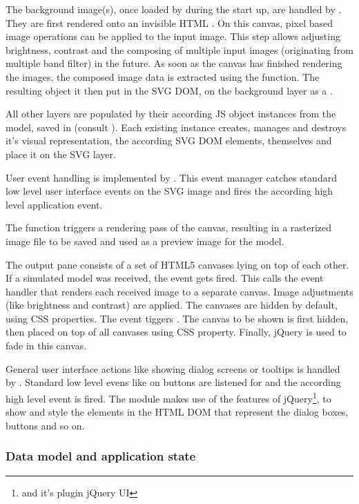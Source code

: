 The background image(s), once loaded by  during the start up, are handled by .
They are first rendered onto an invisible HTML .
On this canvas, pixel based image operations can be applied to the input image.
This step allows adjusting brightness, contrast and the composing of multiple input images (originating from multiple band filter) in the future.
As soon as the canvas has finished rendering the images, the composed image data is extracted using the  function.
The resulting object it then put in the SVG DOM, on the background layer as a .

All other layers are populated by their according JS object instances from the model, saved in  (consult ).
Each existing instance creates, manages and destroys it's visual representation, the according SVG DOM elements, themselves and place it on the SVG layer.

User event handling is implemented by .
This event manager catches standard low level user interface events on the SVG image and fires the according high level application event.

The function  triggers a rendering pass of the canvas, resulting in a rasterized image file to be saved and used as a preview image for the model.


The output pane  consists of a set of HTML5 canvases lying on top of each other.
If a simulated model was received, the event  gets fired.
This calls the event handler  that renders each received image to a separate canvas.
Image adjustments (like brightness and contrast) are applied.
The canvases are hidden by default, using CSS properties.
The event  tiggers .
The canvas to be shown is first hidden, then placed on top of all canvases using CSS  property.
Finally, jQuery is used to fade in this canvas.


General user interface actions like showing dialog screens or tooltips is handled by .
Standard low level evens like  on buttons are listened for and the according high level event is fired.
The module  makes use of the features of jQuery\footnote{and it's plugin jQuery UI}, to show and style the elements in the HTML DOM that represent the dialog boxes, buttons and so on.



\subsubsection{Data model and application state}
\label{sec:state}


